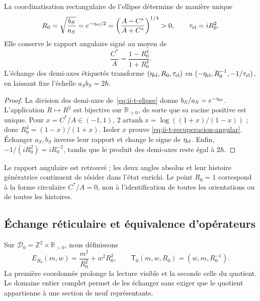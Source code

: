 \begin{proposition}
\label{prop:ii-t-radio}
La coordinatisation rectangulaire de l’ellipse détermine de manière unique
\begin{equation}
 R_0=\sqrt{\frac{b_S}{a_S}}
 =e^{-\eta_{\rm el}/2}
 =\left(\frac{A-C^*}{A+C^*}\right)^{1/4}>0,
 \qquad \tau_{\rm el}=iR_0^2.
 \label{eq:ii-t-radio}
\end{equation}
Elle conserve le rapport angulaire signé au moyen de
\begin{equation}
 \frac{C^*}{A}=\frac{1-R_0^4}{1+R_0^4}.
 \label{eq:ii-t-recuperacion-angular}
\end{equation}
L’échange des demi-axes étiquetés transforme
\((\eta_{\rm el},R_0,\tau_{\rm el})\) en
\((-\eta_{\rm el},R_0^{-1},-1/\tau_{\rm el})\), en laissant fixe
l’échelle \(a_Sb_S=2\hbar\).
\end{proposition}

\begin{proof}
La division des demi-axes de~\eqref{eq:ii-t-elipse} donne
\(b_S/a_S=e^{-\eta_{\rm el}}\). L’application \(R\mapsto R^2\)
est bijective sur \(\mathbb R_{>0}\), de sorte que sa racine positive est
unique. Pour \(x=C^*/A\in(-1,1)\),
\(2\operatorname{artanh}x=\log((1+x)/(1-x))\) ; donc
\(R_0^4=(1-x)/(1+x)\). Isoler \(x\) prouve
\eqref{eq:ii-t-recuperacion-angular}. Échanger \(a_S,b_S\)
inverse leur rapport et change le signe de \(\eta_{\rm el}\). Enfin,
\(-1/(iR_0^2)=iR_0^{-2}\), tandis que le produit des demi-axes
reste égal à \(2\hbar\).
\end{proof}

Le rapport angulaire est retrouvé ; les deux angles absolus et leur histoire
génératrice continuent de résider dans l’état enrichi. Le point \(R_0=1\)
correspond à la forme circulaire \(C^*/A=0\), non à l’identification de
toutes les orientations ou de toutes les histoires.

\subsection{Échange réticulaire et équivalence d’opérateurs}

\begin{definition}
\label{def:ii-t-reticular}
Sur \(\mathscr D_0=\mathbb Z^2\times\mathbb R_{>0}\), nous définissons
\begin{equation}
 E_{R_0}(m,w)=\frac{m^2}{R_0^2}+w^2R_0^2,\qquad
 \mathsf T_0(m,w,R_0)=(w,m,R_0^{-1}).
 \label{eq:ii-t-energia}
\end{equation}
La première coordonnée prolonge la lecture visible et la seconde celle du
quotient. Le domaine entier complet permet de les échanger sans exiger
que le quotient appartienne à une section de neuf représentants.
\end{definition}

